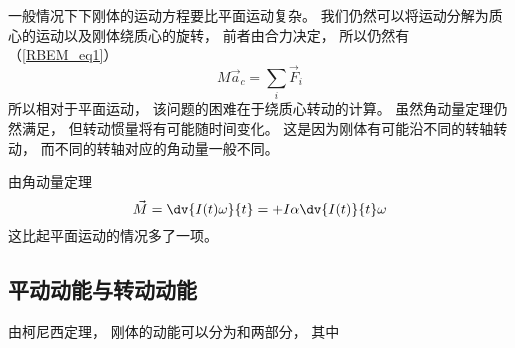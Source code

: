 

一般情况下下刚体的运动方程要比平面运动复杂。 我们仍然可以将运动分解为质心的运动以及刚体绕质心的旋转， 前者由合力决定， 所以仍然有（\autoref{RBEM_eq1}）
\begin{equation}
M\vec a_c = \sum_i \vec F_i
\end{equation}
所以相对于平面运动， 该问题的困难在于绕质心转动的计算。 虽然角动量定理仍然满足， 但转动惯量将有可能随时间变化。 这是因为刚体有可能沿不同的转轴转动， 而不同的转轴对应的角动量一般不同。

由角动量定理
\begin{equation}
\vec M = \dv{I(t) \omega}{t} = + I \alpha  \dv{I(t)}{t} \omega
\end{equation}
这比起平面运动的情况多了一项。


\subsection{平动动能与转动动能}
由柯尼西定理， 刚体的动能可以分为和两部分， 其中
